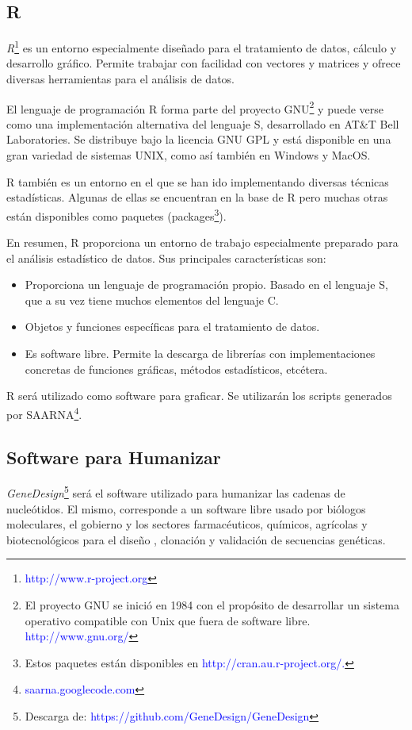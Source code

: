\documentclass[12pt,a4paper,spanish]{article}
\begin{document}
	\subsection{R}
		\par \textit{R}\footnote{\textcolor{blue}{http://www.r-project.org}} es un entorno especialmente diseñado para el 			tratamiento de datos, cálculo y desarrollo gráfico. Permite trabajar con facilidad con vectores y matrices y 			ofrece diversas herramientas para el análisis de datos.
		\par El lenguaje de programación \textsc{R} forma parte del proyecto GNU\footnote{El proyecto GNU se inició en 			1984 con el propósito de desarrollar un sistema operativo compatible con Unix que fuera de software libre. 			\textcolor{blue}{http://www.gnu.org/}} y puede verse como una 		implementación alternativa del lenguaje 		\textsc{S}, desarrollado en AT\&T Bell Laboratories. Se distribuye bajo la licencia GNU GPL y está disponible en 			una gran variedad de sistemas UNIX, como así también en Windows y MacOS.
		\par \textsc{R} también es un entorno en el que se han ido implementando diversas técnicas estadísticas. Algunas 			de ellas se encuentran en la base de \textsc{R} pero muchas otras están disponibles como paquetes (packages\footnote{Estos paquetes están disponibles en \textcolor{blue}{http://cran.au.r-project.org/.}}).
		\par En resumen, R proporciona un entorno de trabajo especialmente preparado para el análisis estadístico de 			datos. Sus principales características son:

		\begin{itemize}
			\item Proporciona un lenguaje de programación propio. Basado en el lenguaje S, que a su vez tiene muchos 						elementos del lenguaje C. 
			\item Objetos y funciones específicas para el tratamiento de datos.
			\item Es software libre. Permite la descarga de librerías con implementaciones concretas de funciones 						gráficas, métodos estadísticos, etcétera.
		\end{itemize}
		\par \textsc{R} será utilizado como software para graficar. Se utilizarán los scripts generados por 
		SAARNA\footnote{\textcolor{blue}{saarna.googlecode.com}}.

	\subsection{Software para Humanizar}
	\label{geneDesigng}
		\par \emph{GeneDesign}\footnote{Descarga de: \textcolor{blue}{https://github.com/GeneDesign/GeneDesign}}  			\cite{4}\cite{5}\cite{6} será el software utilizado para humanizar las cadenas de nucleótidos. El mismo, 			corresponde a un software libre usado por biólogos moleculares, el gobierno y los sectores farmacéuticos, 			químicos, agrícolas y biotecnológicos para el diseño \cite{3}, clonación y validación de secuencias genéticas.
\end{document}

